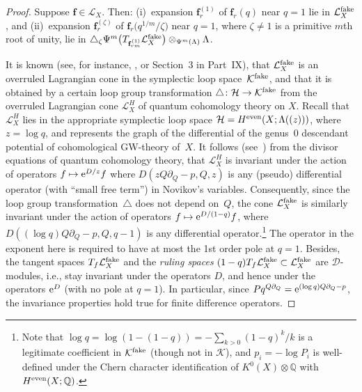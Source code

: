 \documentclass[pdftex]{sigma}
\def\D{\mathcal D}
\def\K{\mathcal K}
\def\L{\mathcal L}
\def\H{\mathcal H}
\def\QQ{\mathbb Q}
\def\p{\partial}
\def\f{{\mathbf f}}
\renewcommand{\Delta}{\triangle}
\begin{document}
\begin{proof} Suppose $\f \in \L_X$. Then: (i)~expansion $\f_r^{(1)}$ of $\f_r(q)$ near $q=1$ lie in $\L_X^{\rm fake}$, and
(ii)~expansion $\f_r^{(\zeta)}$ of $\f_r\big(q^{1/m}/\zeta\big)$ near $q=1$, where $\zeta\neq 1$ is a primitive $m$th root of unity, lie in $\Delta_{\zeta} \Psi^m\big(T_{\f_{rm}^{(1)}}\L_X^{\rm fake}\big) \otimes_{\Psi^m(\Lambda)}\Lambda$.

It is known (see, for instance, \cite{Co, GiTo}, or Section~3 in Part~IX), that
$\L_X^{\rm fake}$ is an overruled Lagrangian cone in the symplectic loop space~$\K^{\rm fake}$, and that it is obtained by a certain loop group transformation $\Delta\colon \H\to \K^{\rm fake}$ from the overruled Lagrangian cone $\L_X^H$ of quantum cohomology theory on $X$. Recall that $\L_X^H$ lies in the appropriate symplectic loop space $\H=H^{\rm even}(X; \Lambda ((z)))$, where $z=\log q$, and represents the graph of the differential of the genus~0 descendant potential of cohomological GW-theory of~$X$. It follows (see~\cite{GiE}) from the divisor equations of quantum cohomology theory, that $\L_X^H$ is invariant under the action of operators $f \mapsto {\rm e}^{D/z}f$ where $D(zQ\p_Q-p, Q,z)$ is any (pseudo) differential operator (with ``small free term'') in Novikov's variables. Consequently, since the loop group transformation~$\Delta$ does not depend on~$Q$, the cone $\L_X^{\rm fake}$ is similarly invariant under the action of operators
$f\mapsto {\rm e}^{D/(1-q)}f$, where $D((\log q)Q\p_Q-p, Q, q-1)$ is any differential operator.\footnote{Note that $\log q = \log (1-(1-q))=-\sum\limits_{k>0} (1-q)^k/k$ is a legitimate coefficient in $\K^{\rm fake}$ (though not in $\K$), and $p_i=-\log P_i$ is well-defined under the Chern character identification of $K^0(X)\otimes \QQ$ with $H^{\rm even}(X;\QQ)$.} The operator in the exponent here is required to have at most the 1st order pole at $q=1$. Besides, the tangent spaces $T_f\L_X^{\rm fake}$ and the {\em ruling spaces} $(1-q)T_f\L_X^{\rm fake} \subset \L_X^{\rm fake}$ are $\D$-modules, i.e., stay invariant under the operators $D$, and hence under the operators ${\rm e}^D$ (with no pole at $q=1$). In particular, since $Pq^{Q\p_Q} ={\rm e}^{(\log q) Q\p_Q-p}$, the invariance properties hold true for finite difference operators.


\end{proof}
\end{document}
